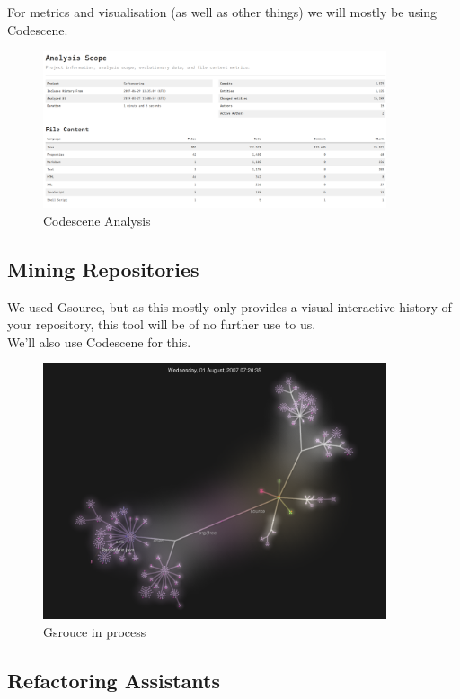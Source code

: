 \documentclass{article}
\begin{document}
For metrics and visualisation (as well as other things) we will mostly be using Codescene.

\begin{figure}[H]
\centering
	\includegraphics[width=0.9\textwidth]{codescene_analysis.png}
	\caption{Codescene Analysis}
\end{figure}

\subsection{Mining Repositories}

We used Gsource, but as this mostly only provides a visual interactive history of your repository, this tool will be of no further use to us.\\

\noindent
We'll also use Codescene for this.


\begin{figure}[H]
\centering
	\includegraphics[width=0.9\textwidth]{gsource.png}
	\caption{Gsrouce in process}
\end{figure}

\subsection{Refactoring Assistants}
\end{document}
